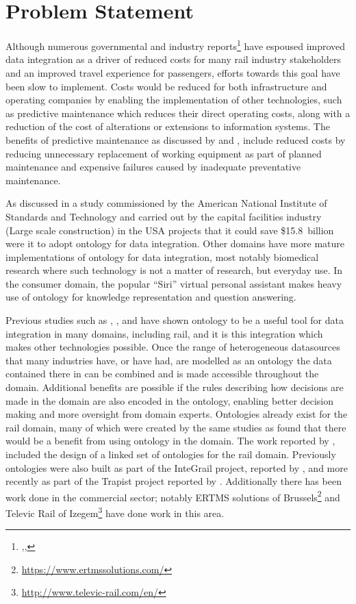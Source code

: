 \chapter{Problem Statement}\label{ch:probstate}
Although numerous governmental and industry reports\footnote{\citep{RDG2017},\citep{DepartmentforTransport2011},\citep{TechnicalStrategyLeadershipGroup2012b}} have espoused improved data integration as a driver of reduced costs for many rail industry stakeholders and an improved travel experience for passengers, efforts towards this goal have been slow to implement. Costs would be reduced for both infrastructure and operating companies by enabling the implementation of other technologies, such as predictive maintenance which reduces their direct operating costs, along with a reduction of the cost of alterations or extensions to information systems. The benefits of predictive maintenance as discussed by \citet{QRE:QRE1634} and \citet{RDG2017}, include reduced costs by reducing unnecessary replacement of working equipment as part of planned maintenance and expensive failures caused by inadequate preventative maintenance. 

As discussed in a study commissioned by the American National Institute of Standards and Technology and carried out by \citep{Gallaher2004} the capital facilities industry (Large scale construction) in the USA projects that it could save \$15.8~billion were it to adopt ontology for data integration. Other domains have more mature implementations of ontology for data integration, most notably biomedical research where such technology is not a matter of research, but everyday use. In the consumer domain, the popular \enquote{Siri} virtual personal assistant makes heavy use of ontology for knowledge representation and question answering.

Previous studies such as \citep{Verstichel2011a}, \citep{Tutcher2013}, and \citep{Morris} have shown ontology to be a useful tool for data integration in many domains, including rail, and it is this integration which makes other technologies possible. Once the range of heterogeneous datasources that many industries have, or have had, are modelled as an ontology the data contained there in can be combined and is made accessible throughout the domain. Additional benefits are possible if the rules describing how decisions are made in the domain are also encoded in the ontology, enabling better decision making and more oversight from domain experts. Ontologies already exist for the rail domain, many of which were created by the same studies as found that there would be a benefit from using ontology in the domain. The work reported by \citet{Tutcher2015}, included the design of a linked set of ontologies for the rail domain. Previously ontologies were also built as part of the InteGrail project, reported by \citet{Kopf2010}, and more recently as part of the Trapist project reported by \citet{Bhatti2016}. Additionally there has been work done in the commercial sector; notably ERTMS solutions of Brussels\footnote{\url{https://www.ertmssolutions.com/}} and Televic Rail of Izegem\footnote{\url{http://www.televic-rail.com/en/}} have done work in this area.

